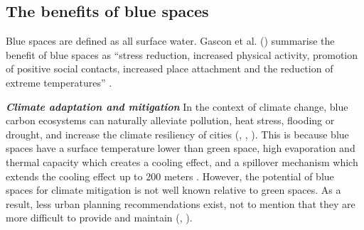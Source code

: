\documentclass{article}
\newcommand{\bisection}[1]{\textbf{\textit{#1}}}
\begin{document}

\subsection{The benefits of blue spaces}

Blue spaces are defined as all surface water.
Gascon et al. (\citeyear{gascon2017outdoor}) summarise the benefit of blue spaces as ``stress reduction, increased physical activity, promotion of positive social contacts, increased place attachment and the reduction of extreme temperatures'' \parencite{gascon2017outdoor}.

\bisection{Climate adaptation and mitigation}
In the context of climate change, blue carbon ecosystems can naturally alleviate pollution, heat stress, flooding or drought, and increase the climate resiliency of cities (\cite{lin2020water}, \cite{manteghi2015water}, \cite{o2021international}). 
This is because blue spaces have a surface temperature lower than green space, high evaporation and thermal capacity which creates a cooling effect, and a spillover mechanism which extends the cooling effect up to 200 meters \parencite{lin2020water}.
However, the potential of blue spaces for climate mitigation is not well known relative to green spaces. As a result, less urban planning recommendations exist, not to mention that they are more difficult to provide and maintain (\cite{manteghi2015water}, \cite{volker2013evidence}).
\end{document}
